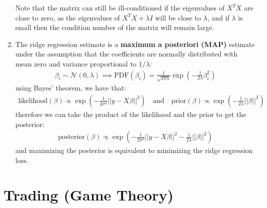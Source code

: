 \documentclass[letterpaper, 11pt]{article}
\newcommand{\normal}[2]{\mathcal{N}\left(#1,#2\right)}
\newcommand{\1}{\mathds{1}}	%
\theoremstyle{definition}
\begin{document}
\begin{enumerate}
    Note that the matrix can still be ill-conditioned if the eigenvalues of $X^TX$ are close to zero, as the eigenvalues of $X^TX + \lambda I$ will be close to $\lambda$, 
    and if $\lambda$ is small then the condition number of the matrix will remain large.
    \item The ridge regression estimate is a \textbf{maximum a posteriori (MAP)} estimate under the 
    assumption that the coefficients are normally distributed with mean zero and variance proportional to $1 / \lambda$:
    \begin{align}
        \beta_i \sim \normal{0}{\lambda} \implies \text{PDF}(\beta_i) = \frac{1}{\sqrt{2\pi \lambda}} \exp\left(-\frac{1}{2\lambda} \beta_i^2\right)
    \end{align}
    using Bayes' theorem, we have that:
    \begin{align}
        \text{likelihood}(\beta) \propto \exp\left(-\frac{1}{2\sigma^2} ||y - X \beta||^2\right) \quad \text{and} \quad \text{prior}(\beta) \propto \exp\left(-\frac{1}{2\lambda} ||\beta||^2\right)
    \end{align}
    therefore we can take the product of the likelihood and the prior to get the posterior:
    \begin{align}
        \text{posterior}(\beta) \propto \exp\left(-\frac{1}{2\sigma^2} ||y - X \beta||^2 - \frac{1}{2\lambda} ||\beta||^2\right)
    \end{align}
    and maximizing the posterior is equivalent to minimizing the ridge regression loss.

\end{enumerate}

\section{Trading (Game Theory)}
\end{document}
